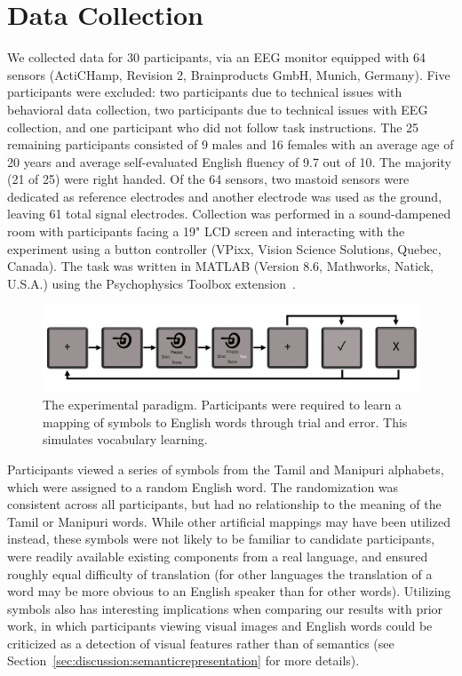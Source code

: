 \section{Data Collection}

We collected data for 30 participants, via an EEG monitor equipped with 64 
sensors (ActiCHamp, Revision 2, Brainproducts GmbH, Munich, Germany). Five 
participants were excluded: two participants due to technical issues with 
behavioral data collection, two participants due to technical issues with EEG 
collection, and one participant who did not follow task instructions. The 25 
remaining participants consisted of 9 males and 16 females with an average age 
of 20 years and average self-evaluated English fluency of 9.7 out of 10.  The 
majority (21 of 25) were right handed. Of the 64 sensors, two mastoid sensors 
were dedicated as reference electrodes and another electrode was used as the 
ground, leaving 61 total signal electrodes.  Collection was performed in a 
sound-dampened room with participants facing a 19" LCD screen and interacting 
with the experiment using a button controller (VPixx, Vision Science Solutions, 
Quebec, Canada).  The task was written in MATLAB (Version 8.6, Mathworks, 
Natick, U.S.A.) using the Psychophysics Toolbox 
extension~\cite{brainard1997psychophysics}.

\begin{figure}[t]
  \centering
  \includegraphics[width=\linewidth]{figures/experiment}
  \caption[Experiment Paradigm]{
    The experimental paradigm. Participants were required to learn a mapping of 
    symbols to English words through trial and error. This simulates vocabulary 
    learning.
  }
  \label{fig:experiment}
\end{figure}

Participants viewed a series of symbols from the Tamil and Manipuri alphabets, 
which were assigned to a random English word. The randomization was consistent 
across all participants, but had no relationship to the meaning of the Tamil or 
Manipuri words. While other artificial mappings may have been utilized instead, 
these symbols were not likely to be familiar to candidate participants, were 
readily available existing components from a real language, and ensured roughly 
equal difficulty of translation (for other languages the translation of a word 
may be more obvious to an English speaker than for other words). Utilizing 
symbols also has interesting implications when comparing our results with prior 
work, in which participants viewing visual images and English words could be 
criticized as a detection of visual features rather than of semantics (see 
Section~\ref{sec:discussion:semanticrepresentation} for more details).

